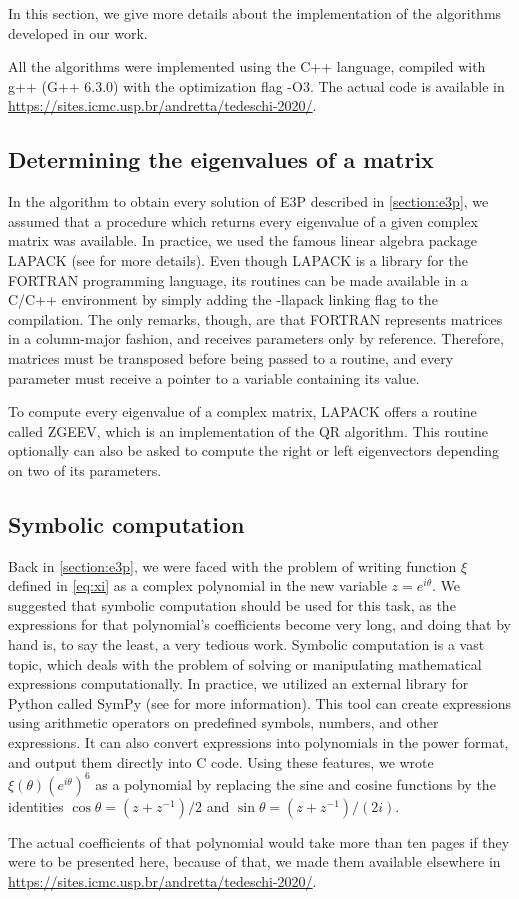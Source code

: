 In this section, we give more details about the implementation of the algorithms developed in our work.

All the algorithms were implemented using the C++ language, compiled with g++ (G++ 6.3.0) with the optimization flag -O3. The actual code is available in \url{https://sites.icmc.usp.br/andretta/tedeschi-2020/}.

\subsection{Determining the eigenvalues of a matrix}

In the algorithm to obtain every solution of E3P described in \autoref{section:e3p}, we assumed that a procedure which returns every eigenvalue of a given complex matrix was available. In practice, we used the famous linear algebra package LAPACK (see \cite{lapack} for more details).
Even though LAPACK is a library for the FORTRAN programming language, its routines can be made available in a C/C++ environment by simply adding the -llapack linking flag to the compilation. The only remarks, though, are that FORTRAN represents matrices in a column-major fashion, and receives parameters only by reference. Therefore, matrices must be transposed before being passed to a routine, and every parameter must receive a pointer to a variable containing its value.

To compute every eigenvalue of a complex matrix, LAPACK offers a routine called ZGEEV, which is an implementation of the QR algorithm.
This routine optionally can also be asked to compute the right or left eigenvectors depending on two of its parameters. 


\subsection{Symbolic computation}


Back in \autoref{section:e3p}, we were faced with the problem of writing function $\xi$ defined in \autoref{eq:xi} as a complex polynomial in the new variable $z=e^{i\theta}$. We suggested that symbolic computation should be used for this task, as the expressions for that polynomial's coefficients become very long, and doing that by hand is, to say the least, a very tedious work.
Symbolic computation is a vast topic, which deals with the problem of solving or manipulating mathematical expressions computationally. 
In practice, we utilized an external library for Python called SymPy (see \cite{sympy} for more information).
This tool can create expressions using arithmetic operators on predefined symbols, numbers, and other expressions. It can also convert expressions into polynomials in the power format, and output them directly into C code. Using these features, we wrote $\xi(\theta)(e^{i\theta})^6$ as a polynomial by replacing the sine and cosine functions by the identities $\cos\theta=(z+z^{-1})/2$ and $\sin\theta=(z+z^{-1})/(2i)$.

The actual coefficients of that polynomial would take more than ten pages if they were to be presented here, because of that, we made them available elsewhere in \url{https://sites.icmc.usp.br/andretta/tedeschi-2020/}.
